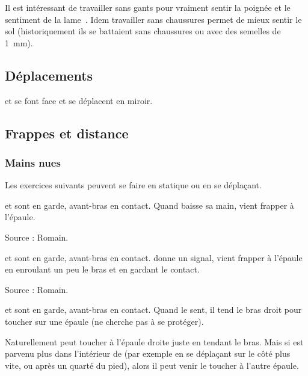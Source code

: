 Il est intéressant de travailler sans gants pour vraiment sentir la poignée et le sentiment de la lame~\cite{enzi:dijon:messer_inner:2015}.
Idem travailler sans chaussures permet de mieux sentir le sol (historiquement ils se battaient sans chaussures ou avec des semelles de \SI{1}{mm}).


\subsection{Déplacements}


\begin{exercice}
\label{ex:general:miroir}

\A et \D se font face et se déplacent en miroir.
\end{exercice}


\subsection{Frappes et distance}


\subsubsection{Mains nues}


Les exercices suivants peuvent se faire en statique ou en se déplaçant.


\begin{exercice}
\label{struct:ex:contact:frappe-signal}

\A et \D sont en garde, avant-bras en contact.
Quand \A baisse sa main, \D vient frapper à l'épaule.

Source : Romain.

\end{exercice}


\begin{exercice}

\A et \D sont en garde, avant-bras en contact.
\A donne un signal, \D vient frapper à l'épaule en enroulant un peu le bras et en gardant le contact.

Source : Romain.

\end{exercice}


\begin{exercice}
\label{struct:ex:contact:frappe-épaules}

\A et \D sont en garde, avant-bras en contact.
Quand \A le sent, il tend le bras droit pour toucher \D sur une épaule (\D ne cherche pas à se protéger).

Naturellement \A peut toucher \D à l'épaule droite juste en tendant le bras.
Mais si \A est parvenu plus dans l'intérieur de \D (par exemple en se déplaçant sur le côté plus vite, ou après un quarté du pied), alors il peut venir le toucher à l'autre épaule.

\end{exercice}


